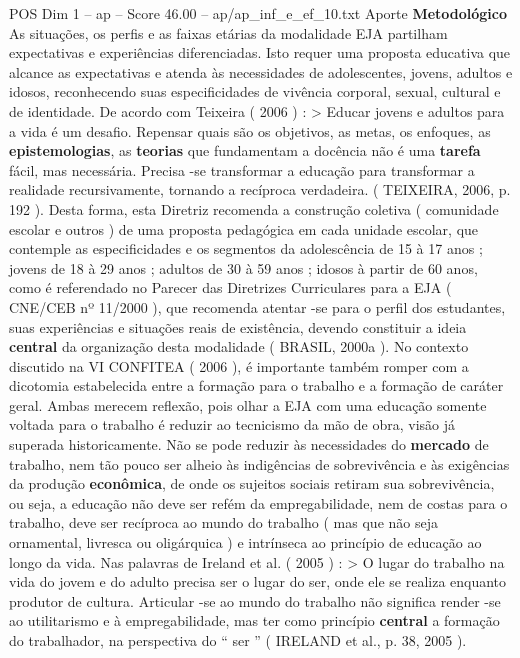 \begin{textsample}{POS Dim 1 – ap – Score 46.00 – ap/ap\_inf\_e\_ef\_10.txt}  \label{ex:f1_pos_167}
Aporte \textbf{Metodológico} As situações, os perfis e as faixas etárias da modalidade EJA partilham expectativas e experiências diferenciadas.
Isto requer uma proposta educativa que alcance as expectativas e atenda às necessidades de adolescentes, jovens, adultos e idosos, reconhecendo suas especificidades de vivência corporal, sexual, cultural e de identidade.
De acordo com Teixeira ( 2006 ) : > Educar jovens e adultos para a vida é um desafio.
Repensar quais são os objetivos, as metas, os enfoques, as \textbf{epistemologias}, as \textbf{teorias} que fundamentam a docência não é uma \textbf{tarefa} fácil, mas necessária.
Precisa -se transformar a educação para transformar a realidade recursivamente, tornando a recíproca verdadeira. ( TEIXEIRA, 2006, p. 192 ).
Desta forma, esta Diretriz recomenda a construção coletiva ( comunidade escolar e outros ) de uma proposta pedagógica em cada unidade escolar, que contemple as especificidades e os segmentos da adolescência de 15 à 17 anos ; jovens de 18 à 29 anos ; adultos de 30 à 59 anos ; idosos à partir de 60 anos, como é referendado no Parecer das Diretrizes Curriculares para a EJA ( CNE/CEB nº 11/2000 ), que recomenda atentar -se para o perfil dos estudantes, suas experiências e situações reais de existência, devendo constituir a ideia \textbf{central} da organização desta modalidade ( BRASIL, 2000a ).
No contexto discutido na VI CONFITEA ( 2006 ), é importante também romper com a dicotomia estabelecida entre a formação para o trabalho e a formação de caráter geral.
Ambas merecem reflexão, pois olhar a EJA com uma educação somente voltada para o trabalho é reduzir ao tecnicismo da mão de obra, visão já superada historicamente.
Não se pode reduzir às necessidades do \textbf{mercado} de trabalho, nem tão pouco ser alheio às indigências de sobrevivência e às exigências da produção \textbf{econômica}, de onde os sujeitos sociais retiram sua sobrevivência, ou seja, a educação não deve ser refém da empregabilidade, nem de costas para o trabalho, deve ser recíproca ao mundo do trabalho ( mas que não seja ornamental, livresca ou oligárquica ) e intrínseca ao princípio de educação ao longo da vida.
Nas palavras de Ireland et al. ( 2005 ) : > O lugar do trabalho na vida do jovem e do adulto precisa ser o lugar do ser, onde ele se realiza enquanto produtor de cultura.
Articular -se ao mundo do trabalho não significa render -se ao utilitarismo e à empregabilidade, mas ter como princípio \textbf{central} a formação do trabalhador, na perspectiva do “ ser ” ( IRELAND et al., p. 38, 2005 ).

\end{textsample}
